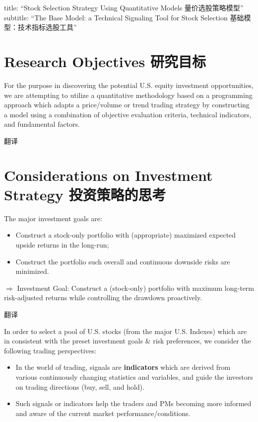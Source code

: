 \documentclass[
]{book}
\begin{document}
title: ``Stock Selection Strategy Using Quantitative Models
量价选股策略模型'' subtitle: ``The Base Model: a Technical Signaling
Tool for Stock Selection 基础模型：技术指标选股工具''

\hypertarget{research-objectives-ux7814ux7a76ux76eeux6807}{%
\section{Research Objectives
研究目标}\label{research-objectives-ux7814ux7a76ux76eeux6807}}

For the purpose in discovering the potential U.S. equity investment
opportunities, we are attempting to utilize a quantitative methodology
based on a programming approach which adapts a price/volume or trend
trading strategy by constructing a model using a combination of
objective evaluation criteria, technical indicators, and fundamental
factors.

翻译

\hypertarget{considerations-on-investment-strategy-ux6295ux8d44ux7b56ux7565ux7684ux601dux8003}{%
\section{Considerations on Investment Strategy
投资策略的思考}\label{considerations-on-investment-strategy-ux6295ux8d44ux7b56ux7565ux7684ux601dux8003}}

The major investment goals are:

\begin{itemize}
\item
  Construct a stock-only portfolio with (appropriate) maximized expected
  upside returns in the long-run;
\item
  Construct the portfolio such overall and continuous downside risks are
  minimized.
\end{itemize}

\(\Rightarrow\) Investment Goal: Construct a (stock-only) portfolio with
maximum long-term risk-adjusted returns while controlling the drawdown
proactively.

翻译

In order to select a pool of U.S. stocks (from the major U.S. Indexes)
which are in consistent with the preset investment goals \& risk
preferences, we consider the following trading perspectives:

\begin{itemize}
\item
  In the world of trading, signals are \textbf{indicators} which are
  derived from various continuously changing statistics and variables,
  and guide the investors on trading directions (buy, sell, and hold).
\item
  Such signals or indicators help the traders and PMs becoming more
  informed and aware of the current market performance/conditions.
\end{itemize}
\end{document}
